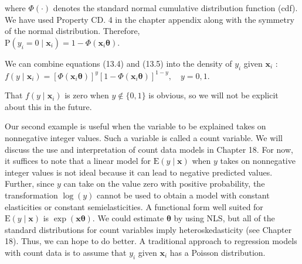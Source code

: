 \documentclass[10pt]{article}
\begin{document}
where $\Phi(\cdot)$ denotes the standard normal cumulative distribution function (cdf). We have used Property CD. 4 in the chapter appendix along with the symmetry of the normal distribution. Therefore,\\
$\mathrm{P}\left(y_{i}=0 \mid \mathbf{x}_{i}\right)=1-\Phi\left(\mathbf{x}_{i} \boldsymbol{\theta}\right)$.

We can combine equations (13.4) and (13.5) into the density of $y_{i}$ given $\mathbf{x}_{i}$ :\\
$f\left(y \mid \mathbf{x}_{i}\right)=\left[\Phi\left(\mathbf{x}_{i} \boldsymbol{\theta}\right)\right]^{y}\left[1-\Phi\left(\mathbf{x}_{i} \boldsymbol{\theta}\right)\right]^{1-y}, \quad y=0,1$.

That $f\left(y \mid \mathbf{x}_{i}\right)$ is zero when $y \notin\{0,1\}$ is obvious, so we will not be explicit about this in the future.

Our second example is useful when the variable to be explained takes on nonnegative integer values. Such a variable is called a count variable. We will discuss the use and interpretation of count data models in Chapter 18. For now, it suffices to note that a linear model for $\mathrm{E}(y \mid \mathbf{x})$ when $y$ takes on nonnegative integer values is not ideal because it can lead to negative predicted values. Further, since $y$ can take on the value zero with positive probability, the transformation $\log (y)$ cannot be used to obtain a model with constant elasticities or constant semielasticities. A functional form well suited for $\mathrm{E}(y \mid \mathbf{x})$ is $\exp (\mathbf{x} \boldsymbol{\theta})$. We could estimate $\boldsymbol{\theta}$ by using NLS, but all of the standard distributions for count variables imply heteroskedasticity (see Chapter 18). Thus, we can hope to do better. A traditional approach to regression models with count data is to assume that $y_{i}$ given $\mathbf{x}_{i}$ has a Poisson distribution.
\end{document}
